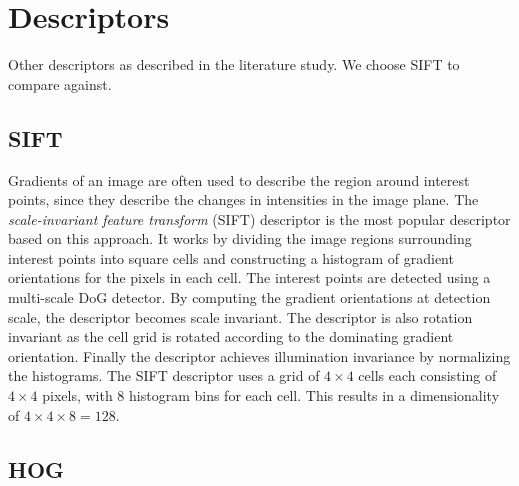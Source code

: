 \documentclass[thesis.tex]{subfiles}
\begin{document}
\section{Descriptors}

Other descriptors as described in the literature study. We choose SIFT to compare against.

\subsection{SIFT}

Gradients of an image are often used to describe the region around interest points, since they describe the changes in intensities in the image plane.
The \emph{scale-invariant feature transform} (SIFT) descriptor
\cite{lowe2004distinctive} is the most popular descriptor based on this
approach. It works by dividing the image regions surrounding interest
points into square cells and constructing a histogram of gradient
orientations for the pixels in each cell. The interest points are detected
using a multi-scale DoG detector. By computing the gradient orientations
at detection scale, the descriptor becomes scale invariant. The descriptor
is also rotation invariant as the cell grid is rotated according to the
dominating gradient orientation. Finally the descriptor achieves illumination
invariance by normalizing the histograms. The SIFT descriptor uses a grid of
$4 \times 4$ cells each consisting of $4 \times 4$ pixels, with 8 histogram
bins for each cell. This results in a dimensionality of $4 \times 4 \times 8 =
128$.


\subsection{HOG}
\end{document}

